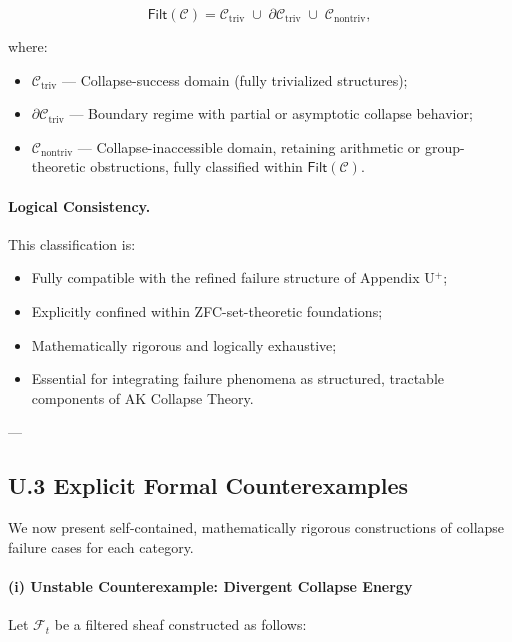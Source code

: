 \documentclass[11pt]{article}
\begin{document}
\[
\mathsf{Filt}(\mathcal{C}) = \mathcal{C}_{\mathrm{triv}} \;\cup\; \partial \mathcal{C}_{\mathrm{triv}} \;\cup\; \mathcal{C}_{\mathrm{nontriv}},
\]

where:

\begin{itemize}
    \item $\mathcal{C}_{\mathrm{triv}}$ — Collapse-success domain (fully trivialized structures);
    \item $\partial \mathcal{C}_{\mathrm{triv}}$ — Boundary regime with partial or asymptotic collapse behavior;
    \item $\mathcal{C}_{\mathrm{nontriv}}$ — Collapse-inaccessible domain, retaining arithmetic or group-theoretic obstructions, fully classified within $\mathsf{Filt}(\mathcal{C})$.
\end{itemize}

\paragraph{Logical Consistency.}

This classification is:

\begin{itemize}
    \item Fully compatible with the refined failure structure of Appendix U$^{+}$;
    \item Explicitly confined within ZFC-set-theoretic foundations;
    \item Mathematically rigorous and logically exhaustive;
    \item Essential for integrating failure phenomena as structured, tractable components of AK Collapse Theory.
\end{itemize}

---

\subsection*{U.3 Explicit Formal Counterexamples}

We now present self-contained, mathematically rigorous constructions of collapse failure cases for each category.

\paragraph{(i) Unstable Counterexample: Divergent Collapse Energy}

Let $\mathcal{F}_t$ be a filtered sheaf constructed as follows:
\end{document}
